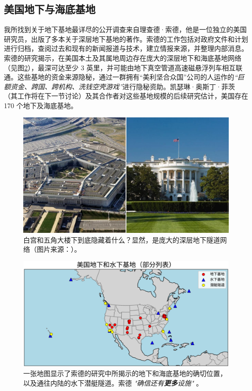 \documentclass[10pt,twocolumn,letterpaper]{article}
\begin{document}
\subsection{美国地下与海底基地}

我所找到关于地下基地最详尽的公开调查来自理查德·索德，他是一位独立的美国研究员，出版了多本关于深层地下基地的著作\cite{22}。索德的工作包括对政府文件和计划进行归档，查阅过去和现有的新闻报道与技术，建立情报来源，并整理内部消息。索德的研究揭示，在美国本土及其属地周边存在庞大的深层地下和海底基地网络（见图\ref{fig:4}），最深可达至少 3 英里，并可能由地下真空管道高速磁悬浮列车相互联通。这些基地的资金来源隐秘，通过一群拥有“美利坚合众国”公司的人运作的\textit{“巨额资金、跨国、跨机构、洗钱空壳游戏”}进行隐秘资助\cite{22}。凯瑟琳·奥斯丁·菲茨（其工作将在下一节讨论）及其合作者对这些基地规模的后续研究估计，美国存在 170 个地下及海底基地\cite{16,20}。

\begin{figure}[t]
\begin{center}
   \includegraphics[width=1\linewidth]{penta.jpg}
\end{center}
   \caption{白宫和五角大楼下到底隐藏着什么？显然，是庞大的深层地下隧道网络（图片来源：\cite{31}）。}
\label{fig:3}
\label{fig:onecol}
\end{figure}

\begin{figure}[t]
\begin{center}
\includegraphics[width=1\textwidth]{baseschn.png}
\end{center}
   \caption{一张地图显示了索德的研究中所揭示的地下和海底基地的确切位置，以及通往内陆的水下潜艇隧道。索德 \textit{"确信还有\textbf{更多}设施"} \cite{22}。}
   \label{fig:4}
\end{figure}
\end{document}
